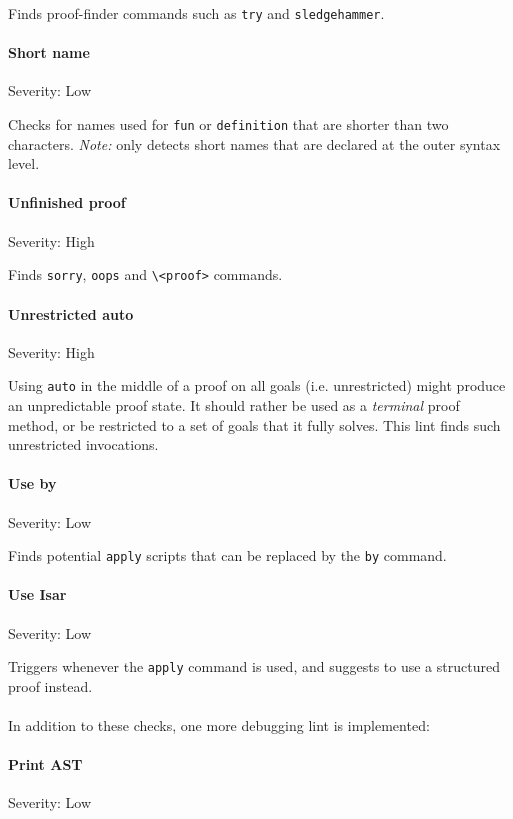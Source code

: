 Finds proof-finder commands such as \texttt{try} and \texttt{sledgehammer}.

\paragraph{Short name}
Severity: Low

Checks for names used for \texttt{fun} or \texttt{definition} that are shorter than 
two characters. \textit{Note:} only detects short names that are declared at the
outer syntax level.

\paragraph{Unfinished proof}
Severity: High

Finds \texttt{sorry}, \texttt{oops} and \texttt{\textbackslash<proof>} commands.

\paragraph{Unrestricted auto}\label{lint:unrestrictedauto}
Severity: High

Using \texttt{auto} in the middle of a proof on all goals (i.e. unrestricted) might 
produce an
unpredictable proof state. It should rather be used as a \textit{terminal} proof
method, or be restricted to a set of goals that it fully solves. This lint finds such
unrestricted invocations.

\paragraph{Use by}\label{lint:useby}
Severity: Low

Finds potential \texttt{apply} scripts that can be replaced by the \texttt{by}
command.

\paragraph{Use Isar}
Severity: Low

Triggers whenever the \texttt{apply} command is used, and suggests to use a 
structured proof instead.

\paragraph{}
In addition to these checks, one more debugging lint is implemented:

\paragraph{Print AST}
Severity: Low

